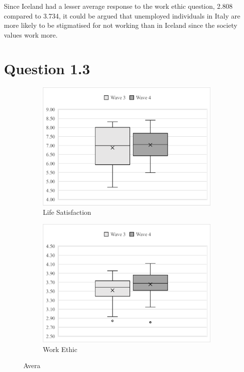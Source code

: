 \documentclass[11pt,a4paper]{article}
\begin{document}
\noindent Since Iceland had a lesser average response to the work ethic question, 2.808 compared to 3.734, it could be argued that unemployed individuals in Italy are more likely to be stigmatised for not working than in Iceland since the society values work more. 

\newpage
\section*{Question 1.3}



\begin{figure}[h]
  \begin{center}
    \begin{subfigure}{0.49\textwidth}
      \includegraphics[width=0.95\linewidth]{figures/LifeSatisfactionQ1_3.png}
      \caption{Life Satisfaction}
      \label{fig:LifeSatisfactionQ1_3}
    \end{subfigure}
    \begin{subfigure}{0.49\textwidth}
      \includegraphics[width=0.95\linewidth]{figures/WorkEthicQ1_3.png}
      \caption{Work Ethic}
      \label{fig:WorthEthicQ1_3}
    \end{subfigure}
  \end{center}
  \caption{Avera}
  \label{fig:Q1_3}
\end{figure}
\end{document}
